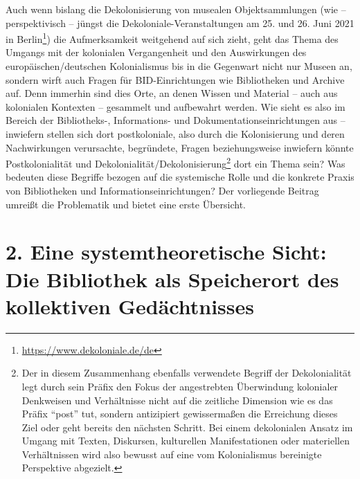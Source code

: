 \documentclass[a4paper,
fontsize=11pt,
oneside,
numbers=noperiodatend,
parskip=half-,
bibliography=totoc,
final
]{scrartcl}
\begin{document}
Auch wenn bislang die Dekolonisierung von musealen Objektsammlungen (wie
-- perspektivisch -- jüngst die Dekoloniale-Veranstaltungen am 25. und
26. Juni 2021 in Berlin\footnote{\url{https://www.dekoloniale.de/de}})
die Aufmerksamkeit weitgehend auf sich zieht, geht das Thema des Umgangs
mit der kolonialen Vergangenheit und den Auswirkungen des
europäischen/deutschen Kolonialismus bis in die Gegenwart nicht nur
Museen an, sondern wirft auch Fragen für BID-Einrichtungen wie
Bibliotheken und Archive auf. Denn immerhin sind dies Orte, an denen
Wissen und Material -- auch aus kolonialen Kontexten -- gesammelt und
aufbewahrt werden. Wie sieht es also im Bereich der Bibliotheks-,
Informations- und Dokumentationseinrichtungen aus -- inwiefern stellen
sich dort postkoloniale, also durch die Kolonisierung und deren
Nachwirkungen verursachte, begründete, Fragen beziehungsweise inwiefern
könnte Postkolonialität und Dekolonialität/Dekolonisierung\footnote{Der
  in diesem Zusammenhang ebenfalls verwendete Begriff der Dekolonialität
  legt durch sein Präfix den Fokus der angestrebten Überwindung
  kolonialer Denkweisen und Verhältnisse nicht auf die zeitliche
  Dimension wie es das Präfix \enquote{post} tut, sondern antizipiert
  gewissermaßen die Erreichung dieses Ziel oder geht bereits den
  nächsten Schritt. Bei einem dekolonialen Ansatz im Umgang mit Texten,
  Diskursen, kulturellen Manifestationen oder materiellen Verhältnissen
  wird also bewusst auf eine vom Kolonialismus bereinigte Perspektive
  abgezielt.} dort ein Thema sein? Was bedeuten diese Begriffe bezogen
auf die systemische Rolle und die konkrete Praxis von Bibliotheken und
Informationseinrichtungen? Der vorliegende Beitrag umreißt die
Problematik und bietet eine erste Übersicht.

\hypertarget{eine-systemtheoretische-sicht-die-bibliothek-als-speicherort-des-kollektiven-geduxe4chtnisses}{%
\section{2. Eine systemtheoretische Sicht: Die Bibliothek als
Speicherort des kollektiven
Gedächtnisses}\label{eine-systemtheoretische-sicht-die-bibliothek-als-speicherort-des-kollektiven-geduxe4chtnisses}}
\end{document}
